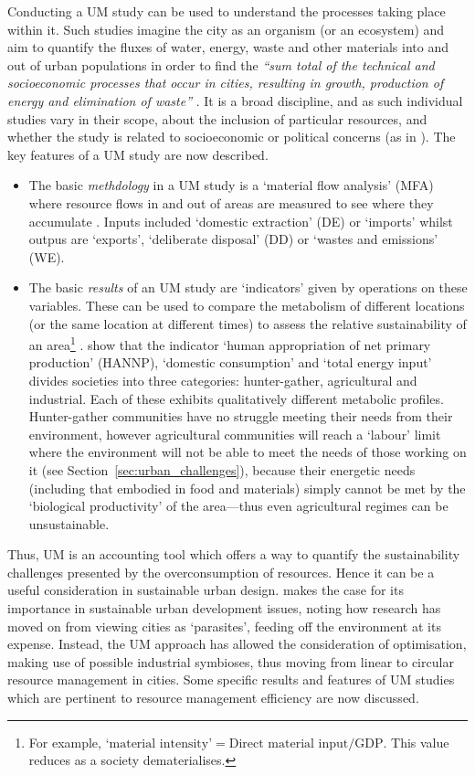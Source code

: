 Conducting a UM study can be used to understand the processes taking place within it. Such studies imagine the city as an organism (or an ecosystem) and aim to quantify the fluxes of water, energy, waste and other materials into and out of urban populations in order to find the \emph{``sum total of the technical and socioeconomic processes that occur in cities, resulting in growth, production of energy and elimination of waste''} \citep[p. 44]{Kennedy2008}. It is a broad discipline, and as such individual studies vary in their scope, about the inclusion of particular resources, and whether the study is related to socioeconomic or political concerns (as in \citet{Hobbes2007}). The key features of a UM study are now described.
\begin{itemize}
	\item The basic \emph{methdology} in a UM study is a `material flow analysis' (MFA) where resource flows in and out of areas are measured to see where they accumulate \citep{Barles2009}. Inputs included `domestic extraction' (DE) or `imports' whilst outpus are `exports', `deliberate disposal' (DD) or `wastes and emissions' (WE). 
	\item The basic \emph{results} of an UM study are `indicators' given by operations on these variables. These can be used to compare the metabolism of different locations (or the same location at different times) to assess the relative sustainability of an area\footnote{For example, $\mbox{`material intensity'}=\mbox{Direct material input}/\mbox{GDP}$. This value reduces as a society dematerialises.} \citep{Hobbes2005}. \citet{Haberl2001a, Haberl2001b} show that the indicator `human appropriation of net primary production' (HANNP), `domestic consumption' and `total energy input' divides societies into three categories: hunter-gather, agricultural and industrial. Each of these exhibits qualitatively different metabolic profiles. Hunter-gather communities have no struggle meeting their needs from their environment, however agricultural communities will reach a `labour' limit where the environment will not be able to meet the needs of those working on it (see Section~\ref{sec:urban_challenges}), because their energetic needs (including that embodied in food and materials) simply cannot be met by the `biological productivity' of the area---thus even agricultural regimes can be unsustainable. 
\end{itemize}
Thus, UM is an accounting tool which offers a way to quantify the sustainability challenges presented by the overconsumption of resources. Hence it can be a useful consideration in sustainable urban design. \citet{Barles2010} makes the case for its importance in sustainable urban development issues, noting how research has moved on from viewing cities as `parasites', feeding off the environment at its expense. Instead, the UM approach has allowed the consideration of optimisation, making use of possible industrial symbioses, thus moving from linear to circular resource management in cities. Some specific results and features of UM studies which are pertinent to resource management efficiency are now discussed.
